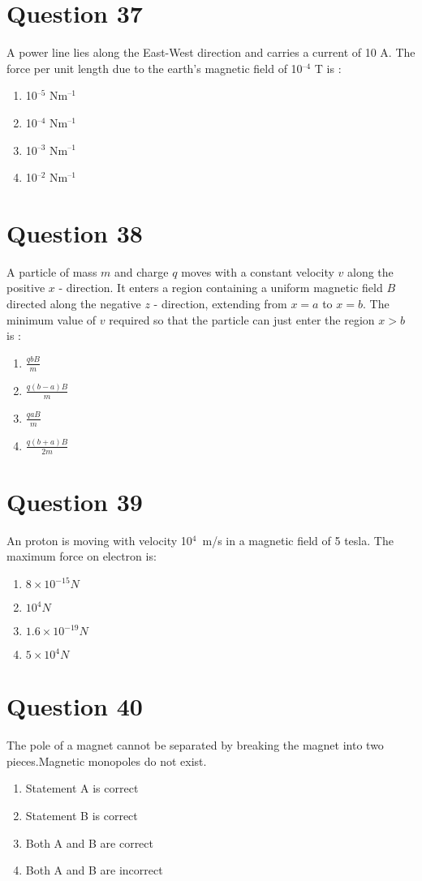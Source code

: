\documentclass{article}
\begin{document}
\section*{Question 37}
A power line lies along the East-West direction and carries a current of 10 A. The force per unit length due to the earth's magnetic field of 10$^{–4}$ T is :
\begin{enumerate}[label=(\alph*)]
\item 10$^{–5}$ Nm$^{–1}$
\item 10$^{–4}$ Nm$^{–1}$
\item 10$^{–3}$ Nm$^{–1}$
\item 10$^{–2}$ Nm$^{–1}$
\end{enumerate}
\newpage
\section*{Question 38}
A particle of mass \(m\) and charge \(q\) moves with a constant velocity \(v\) along the positive \(x\) - direction. It enters a region containing a uniform magnetic field \(B\) directed along the negative \(z\) - direction, extending from \(x = a\) to \(x = b\). The minimum value of \(v\) required so that the particle can just enter the region \(x > b\) is :
\begin{enumerate}[label=(\alph*)]
\item \(\frac{q b B}{m}\)
\item \(\frac{q(b-a) B}{m}\)
\item \(\frac{q a B}{m}\)
\item \(\frac{q(b+a) B}{2 m}\)
\end{enumerate}
\newpage
\section*{Question 39}
An proton is moving with velocity 10$^{4}$ m/s in a magnetic field of 5 tesla. The maximum force on electron is:
\begin{enumerate}[label=(\alph*)]
\item \(8 \times 10^{-15} N\)
\item \(10^4 N\)
\item \(1.6 \times 10^{-19} N\)
\item \(5 \times 10^4 N\)
\end{enumerate}
\newpage
\section*{Question 40}
The pole of a magnet cannot be separated by breaking the magnet into two pieces.Magnetic monopoles do not exist.
\begin{enumerate}[label=(\alph*)]
\item Statement A is correct
\item Statement B is correct
\item Both A and B are correct
\item Both A and B are incorrect
\end{enumerate}
\newpage
\end{document}

